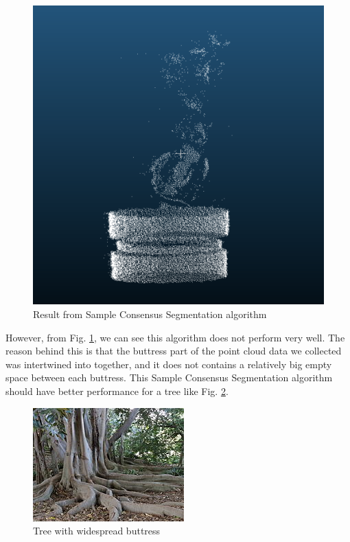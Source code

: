 \documentclass[runningheads,a4paper]{llncs}
\begin{document}
\begin{figure}
\centering
\includegraphics[scale=0.3]{cylinder-extraction-result.png}
\caption{Result from Sample Consensus Segmentation algorithm}
\label{fig:cylinder-extraction-result}
\end{figure}

However, from Fig. \ref{fig:cylinder-extraction-result},  we can see this algorithm does not perform very well. The reason behind this is that the buttress part of the point cloud data we collected was intertwined into together, and it does not contains a relatively big empty space between each buttress. This Sample Consensus Segmentation algorithm should have better performance for a tree like Fig. \ref{fig:widespread-buttress}.

\begin{figure}
\centering
\includegraphics[scale=1]{Buttress_roots.JPG}
\caption{Tree with widespread buttress }
\label{fig:widespread-buttress}
\end{figure}
\end{document}
